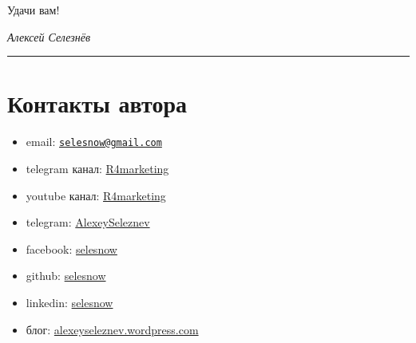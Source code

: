 \documentclass[
]{book}
\providecommand{\tightlist}{%
  \setlength{\itemsep}{0pt}\setlength{\parskip}{0pt}}
\begin{document}
Удачи вам!

\emph{Алексей Селезнёв}

\begin{center}\rule{0.5\linewidth}{0.5pt}\end{center}

\hypertarget{ux43aux43eux43dux442ux430ux43aux442ux44b-ux430ux432ux442ux43eux440ux430}{%
\section*{Контакты автора}\label{ux43aux43eux43dux442ux430ux43aux442ux44b-ux430ux432ux442ux43eux440ux430}}

\begin{itemize}
\tightlist
\item
  email: \href{mailto:selesnow@gmail.com}{\nolinkurl{selesnow@gmail.com}}
\item
  telegram канал: \href{https://t.me/R4marketing}{R4marketing}
\item
  youtube канал: \href{https://www.youtube.com/R4marketing/?sub_confirmation=1}{R4marketing}
\item
  telegram: \href{https://t.me/AlexeySeleznev}{AlexeySeleznev}
\item
  facebook: \href{https://facebook.com/selesnow}{selesnow}
\item
  github: \href{https://github.com/selesnow/}{selesnow}
\item
  linkedin: \href{linkedin.com/in/selesnow}{selesnow}
\item
  блог: \href{https://alexeyseleznev.wordpress.com/}{alexeyseleznev.wordpress.com}
\end{itemize}

  
\end{document}
